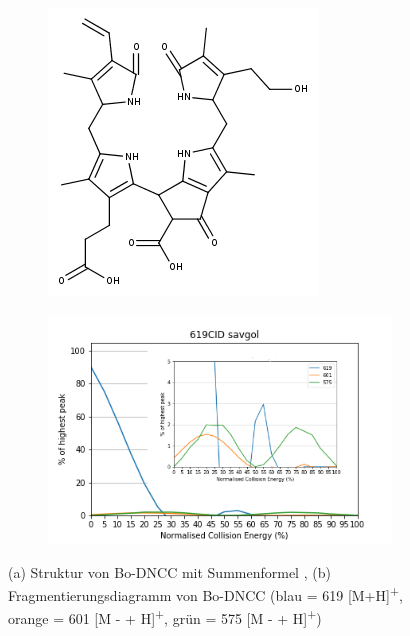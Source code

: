 \begin{figure}[!htbp]
  \begin{subfigure}[b]{0.4\textwidth}
    \includegraphics[width=\textwidth]{figures/Kapitel4/Kataboliten/fragmentation_structures/VWA_Katabolit_619.png}
    \caption{}
    \label{fig:619MKLeafspraystructure}
  \end{subfigure}
  \hfill
  \begin{subfigure}[b]{0.7\textwidth}
    \includegraphics[width=\textwidth]{figures/Kapitel4/Kataboliten/diags/619CID-savgol.png}
    \caption{}
    \label{fig:619MKLeafspraydiags}
  \end{subfigure}
  \caption[Strukturvorschlag von Bo-DNCC mit Fragmentierungsdiagramm, Quelle: Author]{(a) Struktur von Bo-DNCC mit Summenformel , (b) Fragmentierungsdiagramm von Bo-DNCC (blau = 619 [M+H]\textsuperscript{+}, orange = 601 [M -  + H]\textsuperscript{+}, grün = 575 [M -  + H]\textsuperscript{+})}
\end{figure}

